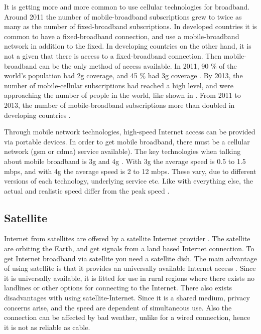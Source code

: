 It is getting more and more common to use cellular technologies for broadband. Around 2011 the number of mobile-broadband subscriptions grew to twice as many as the number of fixed-broadband subscriptions. In developed countries it is common to have a fixed-broadband connection, and use a mobile-broadband network in addition to the fixed. In developing countries on the other hand, it is not a given that there is access to a fixed-broadband connection. Then mobile-broadband can be the only method of access available. In 2011, 90 \% of the world's population had \gls{2g} coverage, and 45 \% had \gls{3g} coverage \cite{itu2011}. By 2013, the number of mobile-cellular subscriptions had reached a high level, and were approaching the number of people in the world, like shown in . From 2011 to 2013, the number of mobile-broadband  subscriptions more than doubled in developing countries \cite{itu2013}. 

Through mobile network technologies, high-speed Internet access can be provided via portable devices. In order to get mobile broadband, there must be a cellular network (\gls{gsm} or \gls{cdma}) service available). The key technologies when talking about mobile broadband is \gls{3g} and \gls{4g} \cite{mobilebroadband}. With \gls{3g} the average speed is 0.5 to 1.5 \gls{mbps}, and with \gls{4g} the average speed is 2 to 12 \gls{mbps}. These vary, due to different versions of each technology, underlying service etc. Like with everything else, the actual and realistic speed differ from the peak speed \cite{3gvs4g}. 


\subsection{Satellite}
Internet from satellites are offered by a satellite Internet provider \cite{cablevssatellite}. The satellite are orbiting the Earth, and get signals from a land based Internet connection. To get Internet broadband via satellite you need a satellite dish. The main advantage of using satellite is that it provides an universally available Internet access \cite{broadband}. Since it is universally available, it is fitted for use in rural regions where there exists no landlines or other options for connecting to the Internet. There also exists disadvantages with using satellite-Internet. Since it is a shared medium, privacy concerns arise, and the speed are dependent of simultaneous use. Also the connection can be affected by bad weather, unlike for a wired connection, hence it is not as reliable as cable. 


